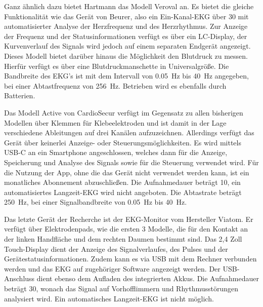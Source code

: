 Ganz ähnlich dazu bietet Hartmann das Modell Veroval an. Es bietet die gleiche Funktionalität wie das Gerät von Beurer, also ein Ein-Kanal-EKG über \SI{30}{\sec} mit automatisierter Analyse der Herzfrequenz und des Herzrhythmus. Zur Anzeige der Frequenz und der Statusinformationen verfügt es über ein LC-Display, der Kurvenverlauf des Signals wird jedoch auf einem separaten Endgerät angezeigt. Dieses Modell bietet darüber hinaus die Möglichkeit den Blutdruck zu messen. Hierfür verfügt es über eine Blutdruckmanschette in Universalgröße. Die Bandbreite des EKG's ist mit dem Intervall von \SI{0.05} {\hertz} bis \SI{40} {\hertz} angegeben, bei einer Abtastfrequenz von \SI{256} {\hertz}. Betrieben wird es ebenfalls durch Batterien. 

Das Modell Active von CardioSecur verfügt im Gegensatz zu allen bisherigen Modellen über Klemmen für Klebeelektroden und ist damit in der Lage verschiedene Ableitungen auf drei Kanälen aufzuzeichnen. Allerdings verfügt das Gerät über keinerlei Anzeige- oder Steuerungsmöglichkeiten. Es wird mittels USB-C an ein Smartphone angeschlossen, welches dann für die Anzeige, Speicherung und Analyse des Signals sowie für die Steuerung verwendet wird. Für die Nutzung der App, ohne die das Gerät nicht verwendet werden kann, ist ein monatliches Abonnement abzuschließen. Die Aufnahmedauer beträgt \SI{10}{\sec}, ein automatisiertes Langzeit-EKG wird nicht angeboten. Die Abtastrate beträgt \SI{250}{\hertz}, bei einer Signalbandbreite von \SI{0.05} {\hertz} bis \SI{40} {\hertz}.

Das letzte Gerät der Recherche ist der EKG-Monitor vom Hersteller Viatom. Er verfügt über Elektrodenpads, wie die ersten 3 Modelle, die für den Kontakt an der linken Handfläche und dem rechten Daumen bestimmt sind. Das 2,4 Zoll Touch-Display dient der Anzeige des Signalverlaufes, des Pulses und der Gerätestatusinformationen. Zudem kann es via USB mit dem Rechner verbunden werden und das EKG auf zugehöriger Software angezeigt werden. Der USB-Anschluss dient ebenso dem Aufladen des integrierten Akkus. Die Aufnahmedauer beträgt \SI{30}{\sec}, wonach das Signal auf Vorhofflimmern und Rhythmusstörungen analysiert wird. Ein automatisches Langzeit-EKG ist nicht möglich. 

